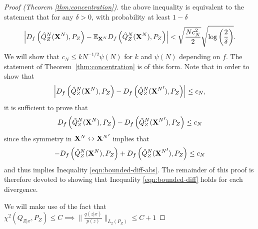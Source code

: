 \begin{proof}[Proof (Theorem \ref{thm:concentration})]
the above inequality is equivalent to the statement that for any $\delta>0$, with probability at least $1-\delta$ 
\begin{align*}
    \left| D_f\left( \hat{Q}_Z^N(\mathbf{X}^N) , P_Z\right) - \mathbb{E}_{\mathbf{X}^N} D_f\left( \hat{Q}_Z^N(\mathbf{X}^N) , P_Z\right) \right| < \sqrt{\frac{Nc_N^2}{2}} \sqrt{\log\left(\frac{2}{\delta}\right)}.
\end{align*}
We will show that $c_N \leq k N^{-1/2} \psi(N)$ for $k$ and $\psi(N)$ depending on $f$.
The statement of Theorem~\ref{thm:concentration} is of this form.
Note that in order to show that
\begin{align}\label{eqn:bounded-diff-abs}
    \left|D_f\left( \hat{Q}_Z^N(\mathbf{X}^N) , P_Z\right) - D_f\left( \hat{Q}_Z^N({\mathbf{X}^N}') , P_Z\right)\right| \leq c_N,
\end{align}
it is sufficient to prove that 
\begin{align}\label{eqn:bounded-diff}
     D_f\left( \hat{Q}_Z^N(\mathbf{X}^N) , P_Z\right) - D_f\left( \hat{Q}_Z^N({\mathbf{X}^N}') , P_Z\right) \leq c_N
\end{align}
since the symmetry in $\mathbf{X}^N \leftrightarrow {\mathbf{X}^N}'$ implies that
\begin{align}
    - D_f\left( \hat{Q}_Z^N(\mathbf{X}^N) , P_Z\right) + D_f\left( \hat{Q}_Z^N({\mathbf{X}^N}') , P_Z\right) \leq c_N
\end{align}
and thus implies Inequality \ref{eqn:bounded-diff-abs}.
The remainder of this proof is therefore devoted to showing that Inequality \ref{eqn:bounded-diff} holds for each divergence.

We will make use of the fact that $\chi^2\left(Q_{Z|x} , P_Z\right) \leq C \implies \bigl\| \frac{q(z|x)}{p(z)} \bigr\|_{L_2(P_Z)} \leq C+1 $


\end{proof}
